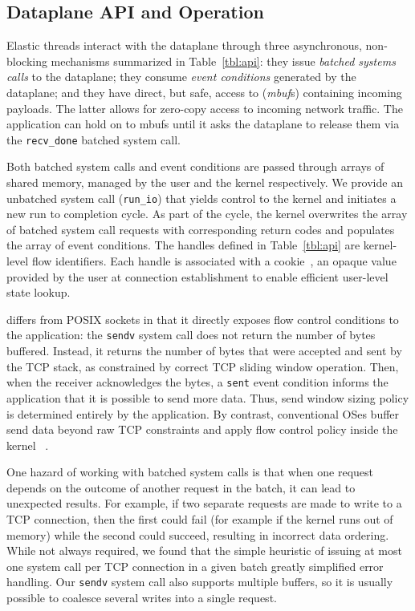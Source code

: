 \subsection{Dataplane API and Operation}
\label{sec:impl:api}

Elastic threads interact with the \ix dataplane through three
asynchronous, non-blocking mechanisms summarized in
Table~\ref{tbl:api}: they issue \emph{batched systems calls} to the
dataplane; they consume \emph{event conditions} generated by the
dataplane; and they have direct, but safe, access to
(\emph{mbuf}s) containing incoming payloads.  The latter allows
for zero-copy access to incoming network traffic.  The application
can hold on to mbufs until it asks the dataplane to
release them via the \texttt{recv\_done} batched system call.

Both batched system calls and event conditions are passed through
arrays of shared memory, managed by the user and the kernel
respectively.  We provide an unbatched system call
(\texttt{run\_io}) that yields control to the kernel and initiates a new run
to completion cycle. As part of the
cycle, the kernel overwrites the array of batched system call requests with
corresponding return codes and populates the array of event conditions.
The handles defined in Table~\ref{tbl:api} are kernel-level flow identifiers. Each handle is
associated with a cookie~\cite{DBLP:conf/osdi/HanMCR12}, an opaque value
provided by the user at connection establishment to enable efficient
user-level state lookup. %

\ix differs from POSIX sockets in that it directly exposes flow
control conditions to the application: the \texttt{sendv} system call
does not return the number of bytes buffered. Instead, it returns the
number of bytes that were accepted and sent by the TCP stack, as
constrained by correct TCP sliding window operation. Then, when the
receiver acknowledges the bytes, a \texttt{sent} event
condition informs the application that it is possible to send more
data. Thus, send window sizing policy is determined entirely by the
application.  By contrast, conventional OSes buffer send data beyond
raw TCP constraints and apply flow control policy inside the kernel
~\cite{dynamicwindow}.

One hazard of working with batched system calls is that when one
request depends on the outcome of another request in the batch, it can
lead to unexpected results. For example, if two separate requests are made to
write to a TCP connection, then the first could fail (for example if the
kernel runs out of memory) while the second could succeed, resulting in incorrect
data ordering. While not always required, we found that the
simple heuristic of issuing at most one system call per TCP connection in a given
batch greatly simplified error handling. Our \texttt{sendv} system
call also supports multiple buffers, so it is
usually possible to coalesce several writes into a single request.

